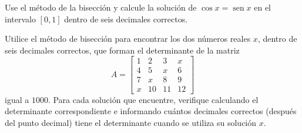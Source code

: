 \begin{questions}
\begin{multicols}{2}
    \end{multicols}

    \question

    Use el método de la bisección y calcule la solución de
    $\cos x=\operatorname{sen}x$ en el intervalo $\left[0,1\right]$
    dentro de seis decimales correctos.

    \question

    Utilice el método de bisección para encontrar los dos números
    reales $x$, dentro de seis decimales correctos, que forman el
    determinante de la matriz
    \begin{equation*}
        A=\begin{bmatrix}
            1 & 2  & 3  & x  \\
            4 & 5  & x  & 6  \\
            7 & x  & 8  & 9  \\
            x & 10 & 11 & 12
        \end{bmatrix}
    \end{equation*}
    igual a $1000$.
    Para cada solución que encuentre, verifique calculando el
    determinante correspondiente e informando cuántos decimales
    correctos (después del punto decimal) tiene el determinante
    cuando se utiliza su solución $x$.

    \question


\end{questions}
